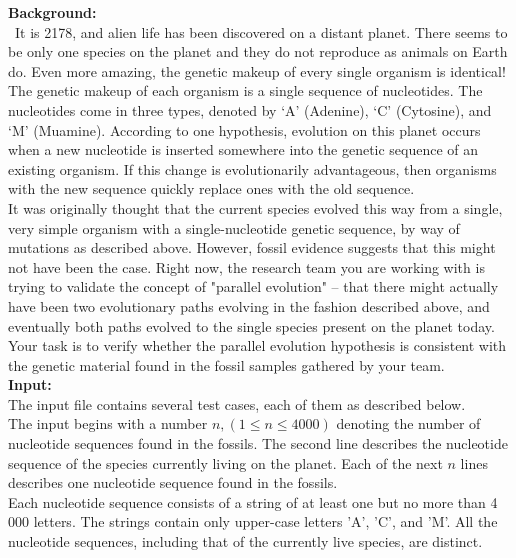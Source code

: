 \documentclass[12pt]{article}
\begin{document}
\noindent \textbf{Background:} \\
~\indent  It is 2178, and alien life has been discovered on a distant planet. There seems to be only one species on
the planet and they do not reproduce as animals on Earth do. Even more amazing, the genetic makeup of every single
organism is identical! \\
\indent The genetic makeup of each organism is a single sequence of nucleotides. The nucleotides come in
three types, denoted by `A' (Adenine), `C' (Cytosine), and `M' (Muamine). According to one hypothesis,
evolution on this planet occurs when a new nucleotide is inserted somewhere into the genetic sequence
of an existing organism. If this change is evolutionarily advantageous, then organisms with the new
sequence quickly replace ones with the old sequence. \\
\indent It was originally thought that the current species evolved this way from a single, very simple
organism with a single-nucleotide genetic sequence, by way of mutations as described above. However,
fossil evidence suggests that this might not have been the case. Right now, the research team you are
working with is trying to validate the concept of "parallel evolution" -- that there might actually have
been two evolutionary paths evolving in the fashion described above, and eventually both paths evolved
to the single species present on the planet today. Your task is to verify whether the parallel evolution
hypothesis is consistent with the genetic material found in the fossil samples gathered by your team. \\

\noindent \textbf{Input:} \\
The input file contains several test cases, each of them as described below. \\
\indent The input begins with a number $n, (1 \leq n \leq 4000)$ denoting the number of nucleotide sequences
found in the fossils. The second line describes the nucleotide sequence of the species currently living
on the planet. Each of the next $n$ lines describes one nucleotide sequence found in the fossils. \\
\indent Each nucleotide sequence consists of a string of at least one but no more than 4 000 letters. The
strings contain only upper-case letters 'A', 'C', and 'M'. All the nucleotide sequences, including that of
the currently live species, are distinct. \\
\end{document}
